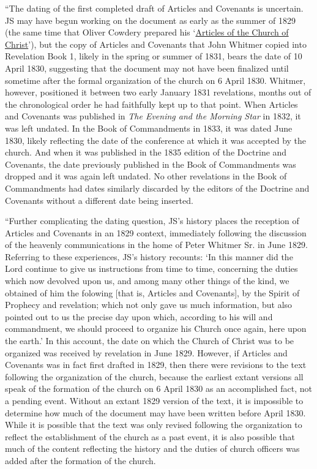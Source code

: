 			``The dating of the first completed draft of Articles and Covenants is uncertain. JS may have begun working on the document as early as the summer of 1829 (the same time that Oliver Cowdery prepared his `\hyperref[EMS-1828-1829-OC-JUNE-1829]{Articles of the Church of Christ}'), but the copy of Articles and Covenants that John Whitmer copied into Revelation Book 1, likely in the spring or summer of 1831, bears the date of 10 April 1830, suggesting that the document may not have been finalized until sometime after the formal organization of the church on 6 April 1830. Whitmer, however, positioned it between two early January 1831 revelations, months out of the chronological order he had faithfully kept up to that point. When Articles and Covenants was published in \textit{The Evening and the Morning Star} in 1832, it was left undated. In the Book of Commandments in 1833, it was dated June 1830, likely reflecting the date of the conference at which it was accepted by the church. And when it was published in the 1835 edition of the Doctrine and Covenants, the date previously published in the Book of Commandments was dropped and it was again left undated. No other revelations in the Book of Commandments had dates similarly discarded by the editors of the Doctrine and Covenants without a different date being inserted.

			``Further complicating the dating question, JS's history places the reception of Articles and Covenants in an 1829 context, immediately following the discussion of the heavenly communications in the home of Peter Whitmer Sr. in June 1829. Referring to these experiences, JS's history recounts: `In this manner did the Lord continue to give us instructions from time to time, concerning the duties which now devolved upon us, and among many other things of the kind, we obtained of him the folowing [that is, Articles and Covenants], by the Spirit of Prophecy and revelation; which not only gave us much information, but also pointed out to us the precise day upon which, according to his will and commandment, we should proceed to organize his Church once again, here upon the earth.' In this account, the date on which the Church of Christ was to be organized was received by revelation in June 1829. However, if Articles and Covenants was in fact first drafted in 1829, then there were revisions to the text following the organization of the church, because the earliest extant versions all speak of the formation of the church on 6 April 1830 as an accomplished fact, not a pending event. Without an extant 1829 version of the text, it is impossible to determine how much of the document may have been written before April 1830. While it is possible that the text was only revised following the organization to reflect the establishment of the church as a past event, it is also possible that much of the content reflecting the history and the duties of church officers was added after the formation of the church.

